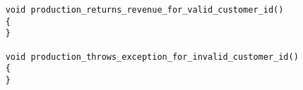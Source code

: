 \begin{verbatim}
    void production_returns_revenue_for_valid_customer_id()    
    {
    }
    
    void production_throws_exception_for_invalid_customer_id()
    {
    }    
\end{verbatim}